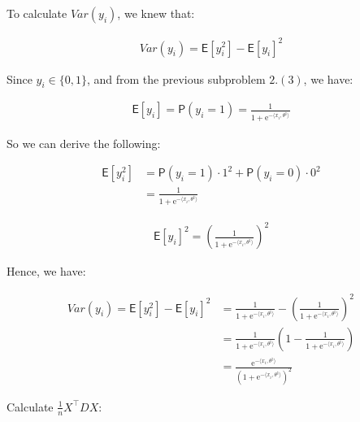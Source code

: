 \documentclass{article}
\begin{document}
To calculate $Var(y_i)$, we knew that:

\begin{align*}
    Var(y_i) = \mathsf{E} [ y_i^2 ] - \mathsf{E} [ y_i ]^2
\end{align*}

Since $y_i \in \{0, 1\}$, and from the previous subproblem $2. (3)$, we have:

\begin{align*}
    \mathsf{E} [ y_i ] = \mathsf{P} ( y_i = 1 ) = \frac{1}{1 + \mathrm{e}^{-\langle x_i, \theta^{\natural} \rangle}}
\end{align*}

So we can derive the following:

\begin{align*}
    \mathsf{E} [ y_i^2 ] 
    &= \mathsf{P} ( y_i = 1 ) \cdot 1^2 + \mathsf{P} ( y_i = 0 ) \cdot 0^2 \\
    &= \frac{1}{1 + \mathrm{e}^{-\langle x_i, \theta^{\natural} \rangle}}
\end{align*}


\begin{align*}
    \mathsf{E} [ y_i ]^2 = \left( \frac{1}{1 + \mathrm{e}^{-\langle x_i, \theta^{\natural} \rangle}} \right)^2
\end{align*}

Hence, we have:

\begin{align*}
    Var(y_i) = \mathsf{E} [ y_i^2 ] - \mathsf{E} [ y_i ]^2
    &= \frac{1}{1 + \mathrm{e}^{-\langle x_i, \theta^{\natural} \rangle}} - \left( \frac{1}{1 + \mathrm{e}^{-\langle x_i, \theta^{\natural} \rangle}} \right)^2 \\
    &= \frac{1}{1 + \mathrm{e}^{-\langle x_i, \theta^{\natural} \rangle}} \left( 1 - \frac{1}{1 + \mathrm{e}^{-\langle x_i, \theta^{\natural} \rangle}} \right) \\
    &= \frac{\mathrm{e}^{-\langle x_i, \theta^{\natural} \rangle}}{(1 + \mathrm{e}^{-\langle x_i, \theta^{\natural} \rangle})^2}
\end{align*}

Calculate $\frac{1}{n}X^\intercal D X$:
\end{document}
